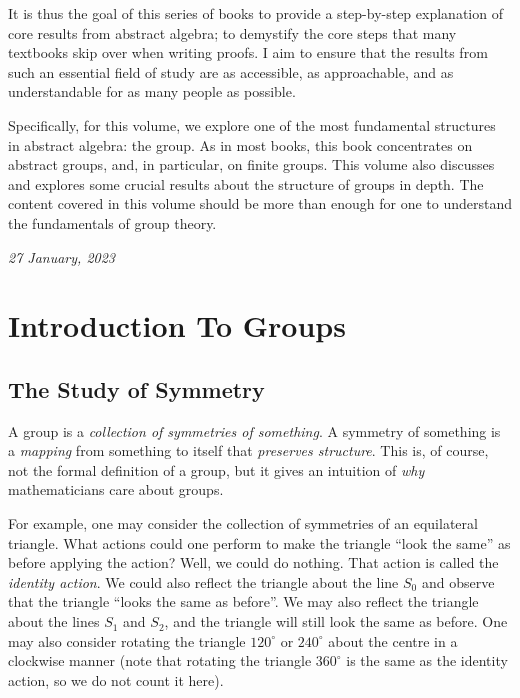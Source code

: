 It is thus the goal of this series of books to provide a step-by-step explanation of core results from abstract algebra; to demystify the core steps that many textbooks skip over when writing proofs. I aim to ensure that the results from such an essential field of study are as accessible, as approachable, and as understandable for as many people as possible.

Specifically, for this volume, we explore one of the most fundamental structures in abstract algebra: the group. As in most books, this book concentrates on abstract groups, and, in particular, on finite groups. This volume also discusses and explores some crucial results about the structure of groups in depth. The content covered in this volume should be more than enough for one to understand the fundamentals of group theory.

\hfill{\textit{27 January, 2023}}
\newpage

\tableofcontents
\setcounter{part}{1}

\chapter{Introduction To Groups}
\section{The Study of Symmetry}
A group is a \textit{collection of symmetries of something}. A symmetry of something is a \textit{mapping} from something to itself that \textit{preserves structure}. This is, of course, not the formal definition of a group, but it gives an intuition of \textit{why} mathematicians care about groups.

\begin{figure}
    \centering
\end{figure}

For example, one may consider the collection of symmetries of an equilateral triangle. What actions could one perform to make the triangle ``look the same'' as before applying the action? Well, we could do nothing. That action is called the \textit{identity action}. We could also reflect the triangle about the line $S_0$ and observe that the triangle ``looks the same as before''. We may also reflect the triangle about the lines $S_1$ and $S_2$, and the triangle will still look the same as before. One may also consider rotating the triangle $120^\circ$ or $240^\circ$ about the centre in a clockwise manner (note that rotating the triangle $360^\circ$ is the same as the identity action, so we do not count it here).

